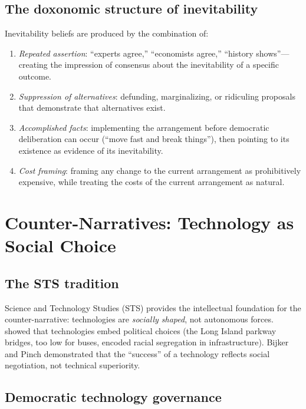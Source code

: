 \subsection{The doxonomic structure of inevitability}

\begin{model}
\label{mod:inevitability}
Inevitability beliefs are produced by the combination of:
\begin{enumerate}[nosep]
  \item \emph{Repeated assertion}: ``experts agree,'' ``economists agree,'' ``history shows''---creating the impression of consensus about the inevitability of a specific outcome.
  \item \emph{Suppression of alternatives}: defunding, marginalizing, or ridiculing proposals that demonstrate that alternatives exist.
  \item \emph{Accomplished facts}: implementing the arrangement before democratic deliberation can occur (``move fast and break things''), then pointing to its existence as evidence of its inevitability.
  \item \emph{Cost framing}: framing any change to the current arrangement as prohibitively expensive, while treating the costs of the current arrangement as natural.
\end{enumerate}
\end{model}

\section{Counter-Narratives: Technology as Social Choice}
\label{sec:ch28-counter}

\subsection{The STS tradition}

Science and Technology Studies (STS) provides the intellectual foundation for the counter-narrative: technologies are \emph{socially shaped}, not autonomous forces.
\textcite{winner1986} showed that technologies embed political choices (the Long Island parkway bridges, too low for buses, encoded racial segregation in infrastructure).
Bijker and Pinch demonstrated that the ``success'' of a technology reflects social negotiation, not technical superiority.

\subsection{Democratic technology governance}

